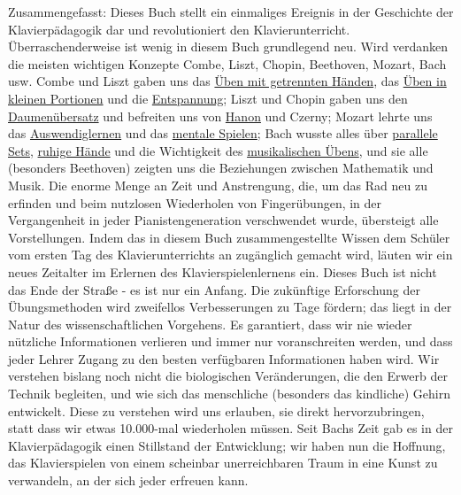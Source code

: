 Zusammengefasst: Dieses Buch stellt ein einmaliges Ereignis in der Geschichte der Klavierpädagogik dar und revolutioniert den Klavierunterricht.
 Überraschenderweise ist wenig in diesem Buch grundlegend neu.
 Wird verdanken die meisten wichtigen Konzepte Combe, Liszt, Chopin, Beethoven, Mozart, Bach usw.
 Combe und Liszt gaben uns das \hyperlink{c1ii7}{Üben mit getrennten Händen}, das \hyperlink{c1ii6}{Üben in kleinen Portionen} und die \hyperlink{c1ii14}{Entspannung};
 Liszt und Chopin gaben uns den \hyperlink{c1iii5b}{Daumenübersatz} und befreiten uns von \hyperlink{c1iii7h}{Hanon} und Czerny;
 Mozart lehrte uns das \hyperlink{c1iii6}{Auswendiglernen} und das \hyperlink{c1ii12mental}{mentale Spielen};
 Bach wusste alles über \hyperlink{c1ii11}{parallele Sets}, \hyperlink{ruhig}{ruhige Hände} und die Wichtigkeit des \hyperlink{c1iii14d}{musikalischen Übens},
 und sie alle (besonders Beethoven) zeigten uns die Beziehungen zwischen Mathematik und Musik.
 Die enorme Menge an Zeit und Anstrengung, die, um das Rad neu zu erfinden und beim nutzlosen Wiederholen von Fingerübungen, in der Vergangenheit in jeder Pianistengeneration verschwendet wurde, übersteigt alle Vorstellungen.
 Indem das in diesem Buch zusammengestellte Wissen dem Schüler vom ersten Tag des Klavierunterrichts an zugänglich gemacht wird, läuten wir ein neues Zeitalter im Erlernen des Klavierspielenlernens ein.
 Dieses Buch ist nicht das Ende der Straße - es ist nur ein Anfang.
 Die zukünftige Erforschung der Übungsmethoden wird zweifellos Verbesserungen zu Tage fördern; das liegt in der Natur des wissenschaftlichen Vorgehens.
 Es garantiert, dass wir nie wieder nützliche Informationen verlieren und immer nur voranschreiten werden, und dass jeder Lehrer Zugang zu den besten verfügbaren Informationen haben wird.
 Wir verstehen bislang noch nicht die biologischen Veränderungen, die den Erwerb der Technik begleiten, und wie sich das menschliche (besonders das kindliche) Gehirn entwickelt.
 Diese zu verstehen wird uns erlauben, sie direkt hervorzubringen, statt dass wir etwas 10.000-mal wiederholen müssen.
 Seit Bachs Zeit gab es in der Klavierpädagogik einen Stillstand der Entwicklung; wir haben nun die Hoffnung, das Klavierspielen von einem scheinbar unerreichbaren Traum in eine Kunst zu verwandeln, an der sich jeder erfreuen kann.
 

